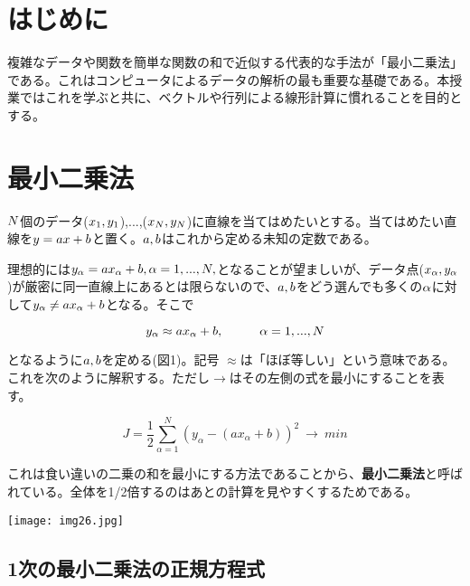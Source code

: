 \documentclass[a4]{jarticle}
\begin{document}
\section{はじめに}
複雑なデータや関数を簡単な関数の和で近似する代表的な手法が「最小二乗法」である。これはコンピュータによるデータの解析の最も重要な基礎である。本授業ではこれを学ぶと共に、ベクトルや行列による線形計算に慣れることを目的とする。

\section{最小二乗法}
${\sl N}$個のデータ(${\sl x_1,y_1}$),...,(${\sl x_N,y_N}$)に直線を当てはめたいとする。当てはめたい直線を${\sl y = ax + b}$と置く。${\sl a,b}$はこれから定める未知の定数である。

理想的には${\sl y_\alpha = ax_\alpha + b,\alpha = 1,...,N,}$となることが望ましいが、データ点(${\sl x_\alpha,y_\alpha}$)が厳密に同一直線上にあるとは限らないので、${\sl a,b}$をどう選んでも多くの${\sl \alpha}$に対して${\sl y_\alpha \neq ax_\alpha + b}$となる。そこで

\begin{equation}
y_\alpha \approx ax_\alpha + b,\hspace{10truemm}  \alpha = 1, ... ,N
\end{equation}

となるように${\sl a,b}$を定める(図1)。記号 $\approx$は「ほぼ等しい」という意味である。これを次のように解釈する。ただし$\to$はその左側の式を最小にすることを表す。

\begin{equation}
J = \frac{1}{2}\sum_{\alpha = 1}^{N}(y_\alpha - (ax_\alpha + b))^2 \  \to \ min
\end{equation}

これは食い違いの二乗の和を最小にする方法であることから、{\bf 最小二乗法}と呼ばれている。全体を1/2倍するのはあとの計算を見やすくするためである。

\begin{center}
\texttt{[image: img26.jpg]}
\end{center}

\subsection{1次の最小二乗法の正規方程式}

\begin{center}
\end{center}
\end{document}
